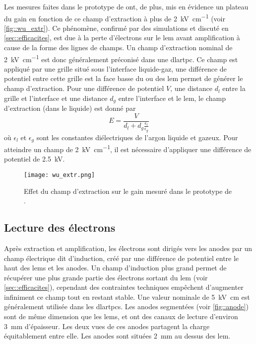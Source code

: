       Les mesures faites dans le prototype de \threeL{} ont, de plus, mis en évidence un plateau du gain en fonction de ce champ d'extraction à plus de \SI{2}{\kilo\volt\per\centi\meter} (voir \autoref{fig::wu_extr}). Ce phénomène, confirmé par des simulations et discuté en \autoref{sec::efficacites}, est due à la perte d'électrons sur le \gls{lem} avant amplification à cause de la forme des lignes de champs. Un champ d'extraction nominal de \SI{2}{\kilo\volt\per\centi\meter} est donc généralement préconisé dans une \gls{dlartpc}. Ce champ est appliqué par une grille situé sous l'interface liquide-gaz, une différence de potentiel entre cette grille est la face basse du ou des \gls{lem} permet de générer le champ d'extraction. Pour une différence de potentiel $V$, une distance $d_l$ entre la grille et l'interface et une distance $d_g$ entre l'interface et le \gls{lem}, le champ d'extraction (dans le liquide) est donné par
      \begin{equation}\label{eq::field_liquid}
        E = \frac{V}{d_l + d_g\frac{\epsilon_l}{\epsilon_g}}
      \end{equation}
      où $\epsilon_l$ et $\epsilon_g$ sont les constantes diélectriques de l'argon liquide et gazeux. Pour atteindre un champ de \SI{2}{\kilo\volt\per\centi\meter}, il est nécessaire d'appliquer une différence de potentiel de \SI{2.5}{\kilo\volt}.

      \begin{figure}[htbp]
        \centering
        \texttt{[image: wu\_extr.png]}
        \caption[Effet du champ d'extraction sur le gain mesuré dans le prototype de \threeL{}.]{\label{fig::wu_extr}Effet du champ d'extraction sur le gain mesuré dans le prototype de \threeL{}\cite{Wu2017}.}
      \end{figure}

    \subsection{Lecture des électrons}\label{sec::induction}
    
      Après extraction et amplification, les électrons sont dirigés vers les anodes par un champ électrique dit d'induction, créé par une différence de potentiel entre le haut des \glspl{lem} et les anodes. Un champ d'induction plus grand permet de récupérer une plus grande partie des électrons sortant du \gls{lem} (voir \autoref{sec::efficacites}), cependant des contraintes techniques empêchent d'augmenter infiniment ce champ tout en restant stable. Une valeur nominale de \SI{5}{\kilo\volt\centi\meter} est généralement utilisée dans les \glspl{dlartpc}. Les anodes segmentées (voir \autoref{fig::anode}) sont de même dimension que les \glspl{lem}, et ont des canaux de lecture d'environ \SI{3}{\milli\meter} d'épaisseur. Les deux vues de ces anodes partagent la charge équitablement entre elle. Les anodes sont situées \SI{2}{\milli\meter} au dessus des \gls{lem}.

